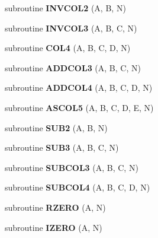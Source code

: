 \begin{CompactItemize}
\item 
\hypertarget{mat1_8F_14e04b3bdfd2c94ce90f645543bf7248}{
subroutine \textbf{INVCOL2} (A, B, N)}
\label{mat1_8F_14e04b3bdfd2c94ce90f645543bf7248}

\item 
\hypertarget{mat1_8F_574377e13c50e655c49c9e7227031478}{
subroutine \textbf{INVCOL3} (A, B, C, N)}
\label{mat1_8F_574377e13c50e655c49c9e7227031478}

\item 
\hypertarget{mat1_8F_983ee4f0d7ba536fd364b8d84f35de54}{
subroutine \textbf{COL4} (A, B, C, D, N)}
\label{mat1_8F_983ee4f0d7ba536fd364b8d84f35de54}

\item 
\hypertarget{mat1_8F_6d8b78a3f52025dee4035154abdc12be}{
subroutine \textbf{ADDCOL3} (A, B, C, N)}
\label{mat1_8F_6d8b78a3f52025dee4035154abdc12be}

\item 
\hypertarget{mat1_8F_7eb98fc2b6b130617d07c335103d644b}{
subroutine \textbf{ADDCOL4} (A, B, C, D, N)}
\label{mat1_8F_7eb98fc2b6b130617d07c335103d644b}

\item 
\hypertarget{mat1_8F_0fd19fc11c0b0fb3cc2e38a192b431fe}{
subroutine \textbf{ASCOL5} (A, B, C, D, E, N)}
\label{mat1_8F_0fd19fc11c0b0fb3cc2e38a192b431fe}

\item 
\hypertarget{mat1_8F_b036eb1df04b44e11eae916bde6a8caa}{
subroutine \textbf{SUB2} (A, B, N)}
\label{mat1_8F_b036eb1df04b44e11eae916bde6a8caa}

\item 
\hypertarget{mat1_8F_168d4a8fff7c56ffcb97d7c8c95481ad}{
subroutine \textbf{SUB3} (A, B, C, N)}
\label{mat1_8F_168d4a8fff7c56ffcb97d7c8c95481ad}

\item 
\hypertarget{mat1_8F_07dac4c23ec13726dca59a412140aebf}{
subroutine \textbf{SUBCOL3} (A, B, C, N)}
\label{mat1_8F_07dac4c23ec13726dca59a412140aebf}

\item 
\hypertarget{mat1_8F_0095fbb3908c51845a14c62d40c3de9d}{
subroutine \textbf{SUBCOL4} (A, B, C, D, N)}
\label{mat1_8F_0095fbb3908c51845a14c62d40c3de9d}

\item 
\hypertarget{mat1_8F_34c5fe54a660caaa5ab2c7a2704f0dec}{
subroutine \textbf{RZERO} (A, N)}
\label{mat1_8F_34c5fe54a660caaa5ab2c7a2704f0dec}

\item 
\hypertarget{mat1_8F_4911f676fbe62926dc47b224fae2558c}{
subroutine \textbf{IZERO} (A, N)}
\label{mat1_8F_4911f676fbe62926dc47b224fae2558c}


\end{CompactItemize}
